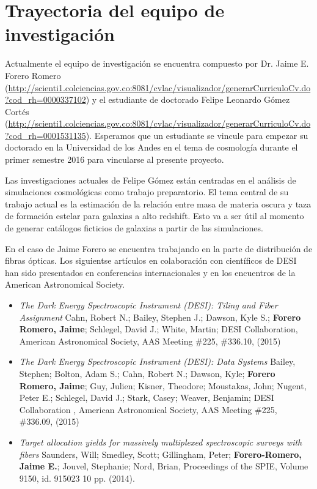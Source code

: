 
\section{Trayectoria del equipo de investigaci\'on}

Actualmente el equipo de investigaci\'on se encuentra compuesto por
Dr. Jaime E. Forero Romero
(\url{http://scienti1.colciencias.gov.co:8081/cvlac/visualizador/generarCurriculoCv.do?cod_rh=0000337102})
y el estudiante de doctorado Felipe Leonardo G\'omez Cort\'es
(\url{http://scienti1.colciencias.gov.co:8081/cvlac/visualizador/generarCurriculoCv.do?cod_rh=0001531135}). 
Esperamos que un estudiante se vincule para empezar su doctorado en la
Universidad de los Andes en el tema de cosmolog\'ia durante el primer
semestre 2016 para vincularse al presente proyecto.

Las investigaciones actuales de Felipe G\'omez est\'an centradas en el
an\'alisis de simulaciones cosmol\'ogicas como trabajo
preparatorio. El tema central de su trabajo actual es la estimaci\'on
de la relaci\'on entre masa de materia oscura y taza de formaci\'on
estelar para galaxias a alto redshift. Esto va a ser \'util al momento
de generar cat\'alogos ficticios de galaxias a partir de las
simulaciones.  

En el caso de Jaime Forero se encuentra trabajando en la parte de
distribuci\'on de fibras \'opticas. Los siguientse art\'iculos en
colaboraci\'on con cient\'ificos de DESI han sido presentados en
conferencias internacionales y en los encuentros de la  American
Astronomical Society.


\begin{itemize}
\item {\it The Dark Energy Spectroscopic Instrument (DESI): Tiling and
  Fiber Assignment} Cahn, Robert N.; Bailey, Stephen J.; Dawson, Kyle
  S.; {\bf Forero Romero, Jaime}; Schlegel, David J.; White, Martin;
  DESI Collaboration, American Astronomical Society, AAS Meeting \#225,
  \#336.10, (2015)
\item {\it The Dark Energy Spectroscopic Instrument (DESI): Data
  Systems} 	
	Bailey, Stephen; Bolton, Adam S.; Cahn, Robert N.; Dawson,
        Kyle; {\bf Forero Romero, Jaime}; Guy, Julien; Kisner, Theodore;
        Moustakas, John; Nugent, Peter E.; Schlegel, David J.; Stark,
        Casey; Weaver, Benjamin; DESI Collaboration , American
        Astronomical Society, AAS Meeting \#225, \#336.09, (2015)
\item {\it Target allocation yields for massively multiplexed
  spectroscopic surveys with fibers} 	
	Saunders, Will; Smedley, Scott; Gillingham, Peter;
        {\bf Forero-Romero, Jaime E.}; Jouvel, Stephanie; Nord, Brian,
        Proceedings of the SPIE, Volume 9150, id. 915023 10
        pp. (2014). 
\end{itemize}



